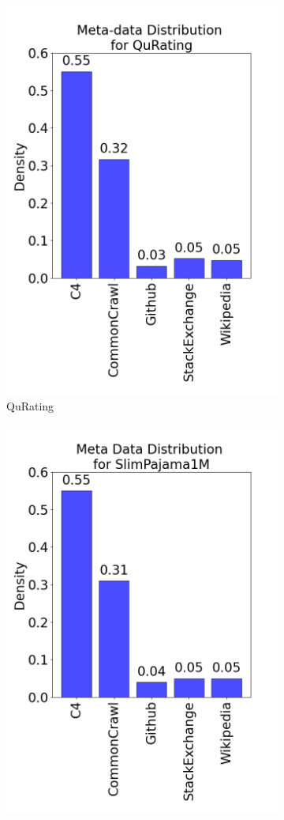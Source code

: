 \documentclass{article}
\begin{document}
\begin{figure}[H]
\begin{subfigure}{0.30\textwidth}
    \includegraphics[width=0.8\linewidth]{figures/Code_data_distribution_plots/data_distribution_ft_4rules_QuRating.png}
    \caption{QuRating}
\end{subfigure}
\begin{subfigure}{0.30\textwidth}
    \includegraphics[width=0.8\linewidth]{figures/Code_data_distribution_plots/data_distribution_SlimPajama1M.png}

\end{subfigure}
\end{figure}
\end{document}
